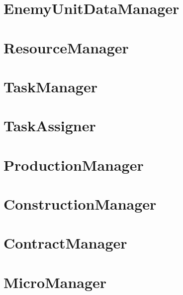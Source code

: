 \section{EnemyUnitDataManager}

\section{ResourceManager}

\section{TaskManager}

\section{TaskAssigner}

\section{ProductionManager}

\section{ConstructionManager}

\section{ContractManager}

\section{MicroManager}

\label{}